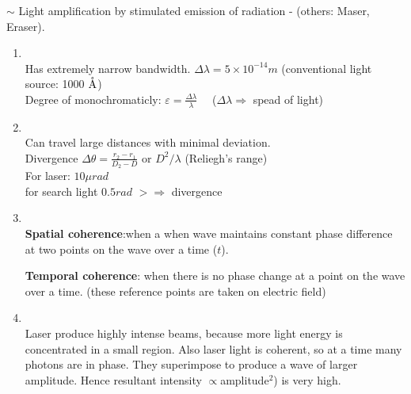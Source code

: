 \documentclass[12pt, a4paper]{article}
\begin{document}
$\sim$ Light amplification by stimulated emission of radiation
- (others: Maser, Eraser).


\begin{enumerate}
	\item {}\\
	      Has extremely narrow bandwidth. $\Delta \lambda=5 \times 10^{-14} \unit{m}$ (conventional light source: 1000 $\mathring{\textrm{A}}$)\\
	      Degree of monochromaticly: $\varepsilon=\frac{\Delta\lambda}{\lambda}$ \ \ ($\Delta\lambda \Rightarrow$ spead of light)
	\item {}\\
	      Can travel large distances with minimal deviation.\\
	      Divergence $\Delta \theta=\frac{r_2-r_1}{D_2-D}$ or $D^2 / \lambda$ (Reliegh's range) \\
	      For laser: $10 \mu\unit{rad}$\\
	      for search light $0.5rad$
	      $>\Rightarrow$ divergence
	\item {}\\
	      \textbf{Spatial coherence}:when a when wave maintains constant phase difference at two points on the wave over a time ($t$).

	      \textbf{Temporal coherence}: when there is no phase change at a point on the wave over a time. (these reference points are taken on electric field)
	\item {}\\
	      Laser produce highly intense beams, because more light energy is concentrated in a small region. Also laser light is coherent, so at a time many photons are in phase. They superimpose to produce a wave of larger amplitude. Hence resultant intensity  $\propto$amplitude$^2$) is very high.
\end{enumerate}

\noparindent
\begin{framed}
\end{framed}
\end{document}
